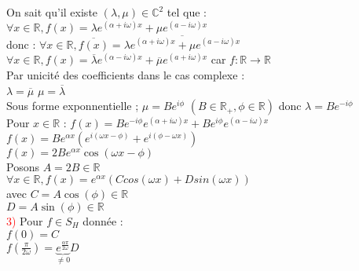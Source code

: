 \documentclass{article}
\begin{document}
	On sait qu'il existe $(\lambda,\mu) \in \mathbb{C}^2$ tel que : \\ 
	$\forall x \in \mathbb{R}, f(x)=\lambda e^{(\alpha +i \omega)x}+ \mu e^{(a-i\omega)x}$ \\ 
	donc : $\forall x \in \mathbb{R}, \overline{f(x)}=\overline {\lambda e^{(\alpha +i \omega)x}+ \mu e^{(a-i\omega)x}}$ \\ 
	$\forall x \in \mathbb{R}, f(x)=\overline {\lambda} e^{(\alpha -i \omega)x}+ \overline{\mu} e^{(a+i\omega)x}$ car $f: \mathbb{R} \rightarrow \mathbb{R}$ \\ 
	Par unicité des coefficients dans le cas complexe : \\ 
	\indent $\lambda=\overline{\mu}$ $\mu= \overline{\lambda}$ \\ 
	Sous forme exponnentielle ; $\mu = B e^{i \phi}$ $(B \in \mathbb{R}_+, \phi \in \mathbb{R})$ donc $\lambda=Be^{-i\phi}$ \\ 
	Pour $x \in \mathbb{R}$ : $f(x) = Be^{-i\phi}e^{(\alpha+i\omega)x}+Be^{i \phi}e^{(\alpha- i \omega)x}$ \\ 
	$f(x)= B e^{\alpha x}(e^{i(\omega x-\phi)}+e^{i(\phi -\omega x)})$ \\ 
	$f(x)=2Be^{\alpha x}\cos(\omega x - \phi)$ \\ 
	Posons $A= 2B \in \mathbb{R}$ \\ 
	$\forall x \in \mathbb{R},f(x)=e^{\alpha x}(C cos(\omega x)+D sin(\omega x))$ \\ 
	avec $ C= A \cos(\phi) \in \mathbb{R}$ \\ 
	$D= A \sin(\phi) \in \mathbb{R}$ \\ 
	\textcolor{red}{3)} Pour $f \in S_H$ donnée : \\ 
	$f(0)=C$ \\ 
	$f(\frac{\pi}{2\omega})=\underbrace{e^{\frac{\alpha \pi}{2 \omega}}}_{\neq 0}D$
\end{document}
